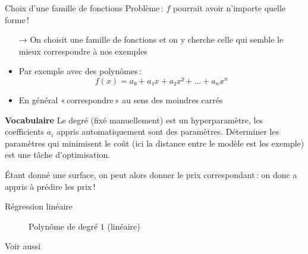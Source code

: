 \documentclass[hyperref={unicode}, xcolor={svgnames}, french]{beamer}
\begin{document}
\begin{frame}{Choix d'une famille de fonctions}
    Problème : $f$ pourrait avoir n'importe quelle forme !
    \begin{itemize}
        \item[→] On choisit une famille de fonctions et on y cherche celle qui semble le mieux correspondre à nos exemples
        \item Par exemple avec des polynômes :
            \begin{equation}
                f(x) = a₀ + a₁x + a₂x²+ … + a_nx^n
            \end{equation}
        \item En général « correspondre » au sens des moindres carrés
    \end{itemize}
    \textbf{Vocabulaire} Le degré (fixé manuellement) est un \alert{hyperparamètre}, les coefficients $a_i$ appris automatiquement sont des \alert{paramètres}.
    Déterminer les paramètres qui minimisent le coût (ici la distance entre le modèle est les exemple) est une tâche d'\alert{optimisation}.

    Étant donné une surface, on peut alors donner le prix correspondant : on donc a appris à prédire les prix !
\end{frame}

\begin{frame}{Régression linéaire}
    \vspace{-1\bigskipamount}
    \begin{figure}
        \tikzset{external/export=true}
        \caption{Polynôme de degré $1$ (linéaire)}
    \end{figure}

    Voir aussi 
\end{frame}
\end{document}
